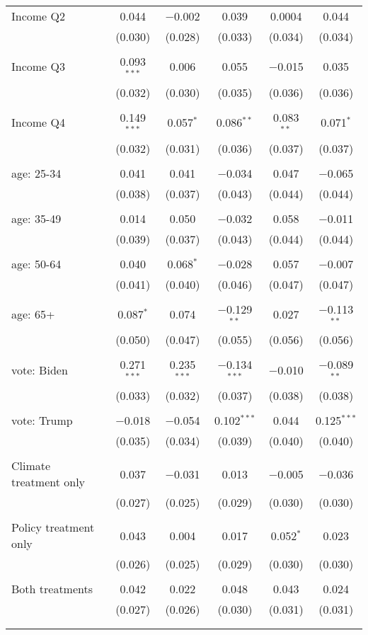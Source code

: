 \begin{tabular}{@{\extracolsep{5pt}}lccccc}
 Income Q2 & 0.044 & $-$0.002 & 0.039 & 0.0004 & 0.044 \\ 
  & (0.030) & (0.028) & (0.033) & (0.034) & (0.034) \\ 
  & & & & & \\ 
 Income Q3 & 0.093$^{***}$ & 0.006 & 0.055 & $-$0.015 & 0.035 \\ 
  & (0.032) & (0.030) & (0.035) & (0.036) & (0.036) \\ 
  & & & & & \\ 
 Income Q4 & 0.149$^{***}$ & 0.057$^{*}$ & 0.086$^{**}$ & 0.083$^{**}$ & 0.071$^{*}$ \\ 
  & (0.032) & (0.031) & (0.036) & (0.037) & (0.037) \\ 
  & & & & & \\ 
 age: 25-34 & 0.041 & 0.041 & $-$0.034 & 0.047 & $-$0.065 \\ 
  & (0.038) & (0.037) & (0.043) & (0.044) & (0.044) \\ 
  & & & & & \\ 
 age: 35-49 & 0.014 & 0.050 & $-$0.032 & 0.058 & $-$0.011 \\ 
  & (0.039) & (0.037) & (0.043) & (0.044) & (0.044) \\ 
  & & & & & \\ 
 age: 50-64 & 0.040 & 0.068$^{*}$ & $-$0.028 & 0.057 & $-$0.007 \\ 
  & (0.041) & (0.040) & (0.046) & (0.047) & (0.047) \\ 
  & & & & & \\ 
 age: 65+ & 0.087$^{*}$ & 0.074 & $-$0.129$^{**}$ & 0.027 & $-$0.113$^{**}$ \\ 
  & (0.050) & (0.047) & (0.055) & (0.056) & (0.056) \\ 
  & & & & & \\ 
 vote: Biden & 0.271$^{***}$ & 0.235$^{***}$ & $-$0.134$^{***}$ & $-$0.010 & $-$0.089$^{**}$ \\ 
  & (0.033) & (0.032) & (0.037) & (0.038) & (0.038) \\ 
  & & & & & \\ 
 vote: Trump & $-$0.018 & $-$0.054 & 0.102$^{***}$ & 0.044 & 0.125$^{***}$ \\ 
  & (0.035) & (0.034) & (0.039) & (0.040) & (0.040) \\ 
  & & & & & \\ 
 Climate treatment only & 0.037 & $-$0.031 & 0.013 & $-$0.005 & $-$0.036 \\ 
  & (0.027) & (0.025) & (0.029) & (0.030) & (0.030) \\ 
  & & & & & \\ 
 Policy treatment only & 0.043 & 0.004 & 0.017 & 0.052$^{*}$ & 0.023 \\ 
  & (0.026) & (0.025) & (0.029) & (0.030) & (0.030) \\ 
  & & & & & \\ 
 Both treatments & 0.042 & 0.022 & 0.048 & 0.043 & 0.024 \\ 
  & (0.027) & (0.026) & (0.030) & (0.031) & (0.031) \\ 
  & & & & & \\ 
\hline \\[-1.8ex] 


\end{tabular}
